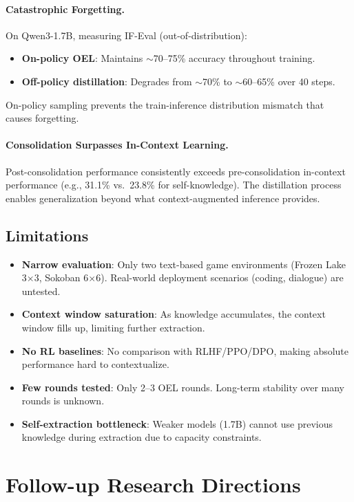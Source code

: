 \documentclass[11pt]{article}
\begin{document}
\paragraph{Catastrophic Forgetting.}
On Qwen3-1.7B, measuring IF-Eval (out-of-distribution):
\begin{itemize}
    \item \textbf{On-policy OEL}: Maintains $\sim$70--75\% accuracy throughout training.
    \item \textbf{Off-policy distillation}: Degrades from $\sim$70\% to $\sim$60--65\% over 40 steps.
\end{itemize}
On-policy sampling prevents the train-inference distribution mismatch that causes forgetting.

\paragraph{Consolidation Surpasses In-Context Learning.}
Post-consolidation performance consistently exceeds pre-consolidation in-context performance (e.g., 31.1\% vs.\ 23.8\% for self-knowledge). The distillation process enables generalization beyond what context-augmented inference provides.

\subsection{Limitations}
\begin{itemize}
    \item \textbf{Narrow evaluation}: Only two text-based game environments (Frozen Lake 3$\times$3, Sokoban 6$\times$6). Real-world deployment scenarios (coding, dialogue) are untested.
    \item \textbf{Context window saturation}: As knowledge accumulates, the context window fills up, limiting further extraction.
    \item \textbf{No RL baselines}: No comparison with RLHF/PPO/DPO, making absolute performance hard to contextualize.
    \item \textbf{Few rounds tested}: Only 2--3 OEL rounds. Long-term stability over many rounds is unknown.
    \item \textbf{Self-extraction bottleneck}: Weaker models (1.7B) cannot use previous knowledge during extraction due to capacity constraints.
\end{itemize}

\section{Follow-up Research Directions}
\end{document}
